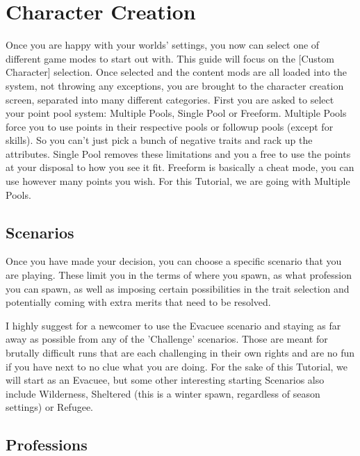 \chapter{Character Creation}

Once you are happy with your worlds' settings, you now can select one of different game modes to start out with. This guide will focus on the [Custom Character] selection. Once selected and the content mods are all loaded into the system, not throwing any exceptions, you are brought to the character creation screen, separated into many different categories. First you are asked to select your point pool system: Multiple Pools, Single Pool or Freeform. Multiple Pools force you to use points in their respective pools or followup pools (except for skills). So you can't just pick a bunch of negative traits and rack up the attributes. Single Pool removes these limitations and you a free to use the points at your disposal to how you see it fit. Freeform is basically a cheat mode, you can use however many points you wish. For this Tutorial, we are going with Multiple Pools.

\section{Scenarios}

Once you have made your decision, you can choose a specific scenario that you are playing. These limit you in the terms of where you spawn, as what profession you can spawn, as well as imposing certain possibilities in the trait selection and potentially coming with extra merits that need to be resolved.

I highly suggest for a newcomer to use the Evacuee scenario and staying as far away as possible from any of the 'Challenge' scenarios. Those are meant for brutally difficult runs that are each challenging in their own rights and are no fun if you have next to no clue what you are doing. For the sake of this Tutorial, we will start as an Evacuee, but some other interesting starting Scenarios also include Wilderness, Sheltered (this is a winter spawn, regardless of season settings) or Refugee.

\section{Professions}

